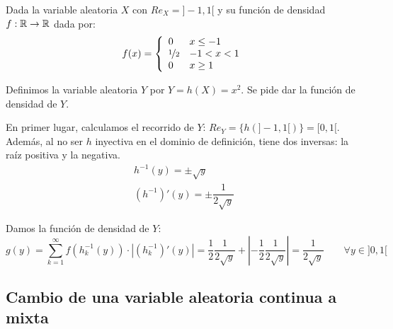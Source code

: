 \begin{ejemplo}
    Dada la variable aleatoria $X$ con $Re_X=]-1, 1[$ y su función de densidad $f:\mathbb R \rightarrow \mathbb R$ dada por:
    $$f(x) = \left\{ \begin{array}{ll}
        0           & x \leq -1  \\
        \nicefrac{1}{2} & -1 < x < 1 \\
        0           & x \geq 1
    \end{array} \right. $$
    
    Definimos la variable aleatoria $Y$ por $Y=h(X) =x^2$. Se pide dar la función de densidad de $Y$.
    
    En primer lugar, calculamos el recorrido de $Y$: $Re_Y=\{h(]-1,1[)\} = [0,1[$. Además, al no ser $h$ inyectiva en el dominio de definición, tiene dos inversas: la raíz positiva y la negativa.
    \begin{gather*}
        h^{-1}(y) = \pm \sqrt{y}\\
        (h^{-1})'(y) = \pm \dfrac{1}{2\sqrt{y}}
    \end{gather*}
    
    Damos la función de densidad de $Y$:
    $$g(y) = \sum_{k=1}^{\infty} f(h^{-1}_k(y)) \cdot |(h^{-1}_k)'(y)|
    =  \dfrac{1}{2} \dfrac{1}{2\sqrt{y}} + \left|-\dfrac{1}{2} \dfrac{1}{2\sqrt{y}}\right|
    =  \dfrac{1}{2\sqrt{y}} \qquad \forall y \in ]0,1[$$
\end{ejemplo}

\subsection{Cambio de una variable aleatoria continua a mixta}

